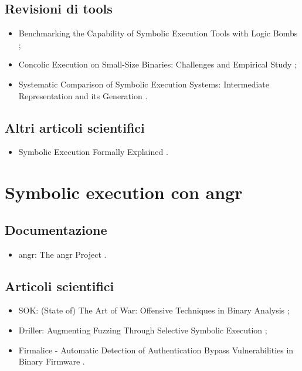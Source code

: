 \subsection*{Revisioni di tools}
\begin{itemize}

\item Benchmarking the Capability of Symbolic Execution Tools with Logic Bombs \cite{xu2020symbexetools};

\item Concolic Execution on Small-Size Binaries: Challenges and Empirical Study \cite{xu2017symbexetools};

\item Systematic Comparison of Symbolic Execution Systems: Intermediate Representation and its Generation \cite{poeplau2019symbexetools}.

\end{itemize}

\subsection*{Altri articoli scientifici}
\begin{itemize}

\item Symbolic Execution Formally Explained \cite{boer2021symbexe}.

\end{itemize}

\section*{Symbolic execution con angr}

\subsection*{Documentazione}
\begin{itemize}

\item angr: The angr Project \cite{angr9.2.90doc}.

\end{itemize}

\subsection*{Articoli scientifici}
\begin{itemize}

\item SOK: (State of) The Art of War: Offensive Techniques in Binary Analysis \cite{shoshitaishvili2016angr};

\item Driller: Augmenting Fuzzing Through Selective Symbolic Execution \cite{stephens2016driller};

\item Firmalice - Automatic Detection of Authentication Bypass Vulnerabilities in Binary Firmware \cite{shoshitaishvili2015firmlice}.

\end{itemize}


